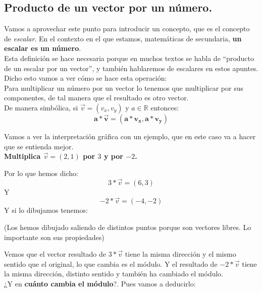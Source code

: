 \documentclass[a4paper,11pt,answers]{exam}
\begin{document}
\subsection{Producto de un vector por un número.} \label{producto_por_escalar}
Vamos a aprovechar este punto para introducir un concepto, que es el concepto de \emph{escalar}.
En el contexto en el que estamos, matemáticas de secundaria, \textbf{un escalar es un número}.\\
Esta definición se hace necesaria porque en muchos textos se habla de ``producto de un escalar
por un vector'', y también hablaremos de escalares en estos apuntes.\\
Dicho esto vamos a ver cómo se hace esta operación:\\

Para multiplicar un número por un vector lo tenemos que multiplicar por sus componentes, de tal
manera que el resultado es otro vector.\\
De manera simbólica, si $\vec{v} = (v_x, v_y)$ y $a \in \mathbb{R}$ entonces:
\[\boldsymbol {a*\vec{v} = (a*v_x, a*v_y)}\]

Vamos a ver la interpretación gráfica con un ejemplo, que en este caso va a hacer que se entienda mejor.\\
\textbf{Multiplica $\vec{v} = (2, 1)$ por $3$ y por $-2$.}
\begin{solution}
  Por lo que hemos dicho:
  \[3*\vec{v} = (6,3)\]
  Y
  \[-2*\vec{v} = (-4,-2)\]
  Y si lo dibujamos tenemos:
  \begin{center}
  \end{center}
  \begin{center}\small{(Los hemos dibujado saliendo de distintos puntos porque son vectores
      libres. Lo importante son sus propiedades)}\end{center}
\end{solution}
Vemos que el vector resultado de $3*\vec{v}$ tiene la misma dirección y el mismo sentido que el original, lo que cambia es el módulo. Y el resultado de $-2*\vec{v}$ tiene la misma dirección, distinto
sentido y también ha cambiado el módulo.\\
¿Y en \textbf{cuánto cambia el módulo}?. Pues vamos a deducirlo:\\
\end{document}
